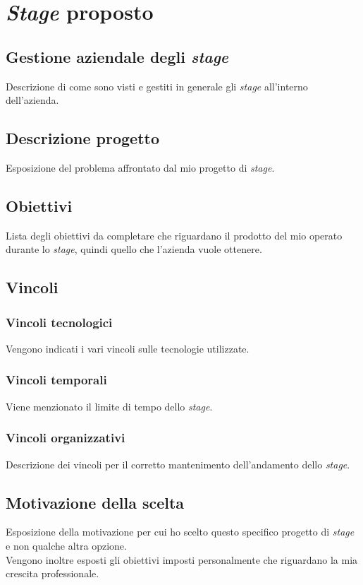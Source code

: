 \chapter{\textit{Stage} proposto}
\label{chap:stage-proposto}

\section{Gestione aziendale degli \textit{stage}}\noindent
Descrizione di come sono visti e gestiti in generale gli \textit{stage} all'interno dell'azienda.

\section{Descrizione progetto}\noindent
Esposizione del problema affrontato dal mio progetto di \textit{stage}.

\section{Obiettivi}\noindent
Lista degli obiettivi da completare che riguardano il prodotto del mio operato durante lo \textit{stage}, quindi quello che l'azienda vuole ottenere.

\section{Vincoli}

\subsection{Vincoli tecnologici}\noindent
Vengono indicati i vari vincoli sulle tecnologie utilizzate.

\subsection{Vincoli temporali}\noindent
Viene menzionato il limite di tempo dello \textit{stage}.

\subsection{Vincoli organizzativi}\noindent
Descrizione dei vincoli per il corretto mantenimento dell'andamento dello \textit{stage}.

\section{Motivazione della scelta}\noindent
Esposizione della motivazione per cui ho scelto questo specifico progetto di \textit{stage} e non qualche altra opzione.\\
Vengono inoltre esposti gli obiettivi imposti personalmente che riguardano la mia crescita professionale.